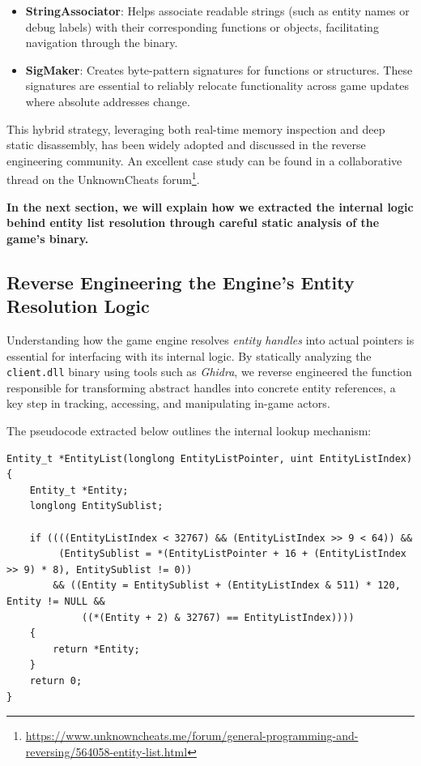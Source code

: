 \begin{tcolorbox}[colback=gray!03, colframe=black!15, sharp corners, boxrule=0.3mm, width=\textwidth]
\begin{itemize}
        \item \textbf{StringAssociator}:  
        Helps associate readable strings (such as entity names or debug labels) with their corresponding functions or objects, facilitating navigation through the binary.
    
        \item \textbf{SigMaker}:  
        Creates byte-pattern signatures for functions or structures. These signatures are essential to reliably relocate functionality across game updates where absolute addresses change.
    \end{itemize}
    
    \vspace{0.4cm}
    
    This hybrid strategy, leveraging both real-time memory inspection and deep static disassembly, has been widely adopted and discussed in the reverse engineering community.  
    An excellent case study can be found in a collaborative thread on the UnknownCheats forum\footnote{\url{https://www.unknowncheats.me/forum/general-programming-and-reversing/564058-entity-list.html}}.
    
    \vspace{0.4cm}
    
    \noindent\textbf{In the next section, we will explain how we extracted the internal logic behind entity list resolution through careful static analysis of the game’s binary.}
    
\end{tcolorbox}

\newpage
\subsection{Reverse Engineering the Engine's Entity Resolution Logic}

Understanding how the game engine resolves \textit{entity handles} into actual pointers is essential for interfacing with its internal logic.  
By statically analyzing the \texttt{client.dll} binary using tools such as \textit{Ghidra}, we reverse engineered the function responsible for transforming abstract handles into concrete entity references, a key step in tracking, accessing, and manipulating in-game actors.

The pseudocode extracted below outlines the internal lookup mechanism:

\begin{lstlisting}[style=cppstyle, caption={Entity Handle Resolution Logic}]
Entity_t *EntityList(longlong EntityListPointer, uint EntityListIndex)
{
    Entity_t *Entity;
    longlong EntitySublist;

    if ((((EntityListIndex < 32767) && (EntityListIndex >> 9 < 64)) &&
         (EntitySublist = *(EntityListPointer + 16 + (EntityListIndex >> 9) * 8), EntitySublist != 0))
        && ((Entity = EntitySublist + (EntityListIndex & 511) * 120, Entity != NULL &&
             ((*(Entity + 2) & 32767) == EntityListIndex))))
    {
        return *Entity;
    }
    return 0;
}   
\end{lstlisting}

